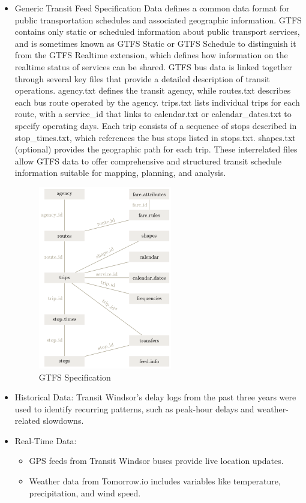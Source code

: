 \documentclass[conference]{IEEEtran}
\begin{document}
\begin{itemize}
    \item Generic Transit Feed Specification Data defines a common data format for public transportation schedules and associated geographic information. GTFS contains only static or scheduled information about public transport services, and is sometimes known as GTFS Static or GTFS Schedule to distinguish it from the GTFS Realtime extension, which defines how information on the realtime status of services can be shared. GTFS bus data is linked together through several key files that provide a detailed description of transit operations. agency.txt defines the transit agency, while routes.txt describes each bus route operated by the agency. trips.txt lists individual trips for each route, with a service\_id that links to calendar.txt or calendar\_dates.txt to specify operating days. Each trip consists of a sequence of stops described in stop\_times.txt, which references the bus stops listed in stops.txt. shapes.txt (optional) provides the geographic path for each trip. These interrelated files allow GTFS data to offer comprehensive and structured transit schedule information suitable for mapping, planning, and analysis.
    \begin{figure}
        \centering
        \includegraphics[width=0.6\linewidth]{GTFS.png}
        \caption{GTFS Specification}
        \label{fig:enter-label}
    \end{figure}
        
    \item Historical Data:  Transit Windsor’s delay logs from the past three years were used to identify recurring patterns, such as peak-hour delays and weather-related slowdowns.
    \item Real-Time Data:
    \begin{itemize}
        \item GPS feeds from Transit Windsor buses provide live location updates.
        \item Weather data from Tomorrow.io includes variables like temperature, precipitation, and wind speed.
    \end{itemize}
\end{itemize}
\end{document}
